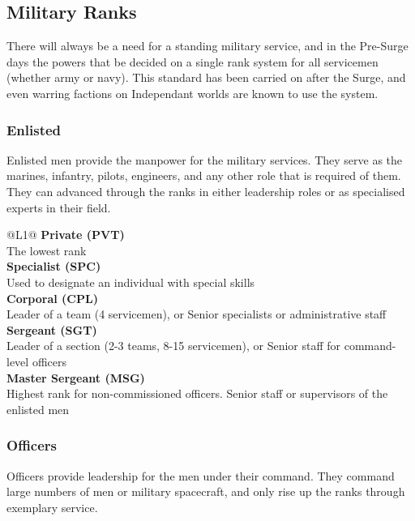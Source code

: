 \subsection{Military Ranks}

There will always be a need for a standing military service, and in the Pre-Surge days the powers that be decided on a single rank system for all servicemen (whether army or navy). This standard has been carried on after the Surge, and even warring factions on Independant worlds are known to use the system.

\subsubsection{Enlisted}

Enlisted men provide the manpower for the military services. They serve as the marines, infantry, pilots, engineers, and any other role that is required of them. They can advanced through the ranks in either leadership roles or as specialised experts in their field.

\begin{redtable}{\linewidth}{@{}L{1}@{}}
  \textbf{Private (PVT)}\\
  The lowest rank\\
  \textbf{Specialist (SPC)}\\
  Used to designate an individual with special skills\\
  \textbf{Corporal (CPL)}\\
  Leader of a team (4 servicemen), or Senior specialists or administrative staff\\
  \textbf{Sergeant (SGT)}\\
  Leader of a section (2-3 teams, 8-15 servicemen), or Senior staff for command-level officers\\
  \textbf{Master Sergeant (MSG)}\\
  Highest rank for non-commissioned officers. Senior staff or supervisors of the enlisted men\\
\end{redtable}

\subsubsection{Officers}

Officers provide leadership for the men under their command. They command large numbers of men or military spacecraft, and only rise up the ranks through exemplary service.

